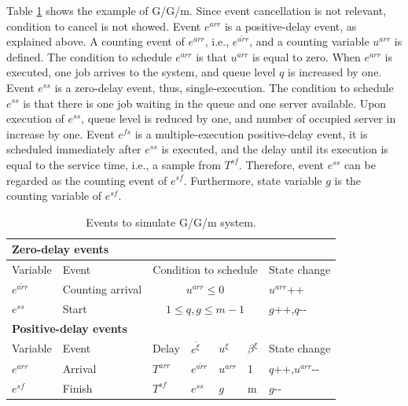 \documentclass[]{interact}
\theoremstyle{plain}%
\theoremstyle{definition}
\theoremstyle{remark}
\begin{document}
Table \ref{tab:ggm_1} shows the example of G/G/m. Since event cancellation is not relevant, condition to cancel is not showed. Event $e^{arr}$ is a positive-delay event, as explained above. %
A counting event of $e^{arr}$, i.e., $e^{\tilde{arr}}$, and a counting variable $u^{arr}$ is defined. The condition to schedule $e^{arr}$ is that $u^{arr}$ is equal to zero. When $e^{arr}$ is executed, one job arrives to the system, and queue level $q$ is increased by one. Event $e^{ss}$ is a zero-delay event, thus, single-execution. The condition to schedule $e^{ss}$ is that there is one job waiting in the queue and one server available. Upon execution of $e^{ss}$, queue level is reduced by one, and number of occupied server in increase by one. Event $e^{fs}$ is a multiple-execution positive-delay event, it is scheduled immediately after $e^{ss}$ is executed, and the delay until its execution is equal to the service time, i.e., a sample from $T^{sf}$. Therefore, event $e^{ss}$ can be regarded as the counting event of $e^{sf}$. Furthermore, state variable $g$ is the counting variable of $e^{sf}$. %

\begin{table}[h]
	\begin{tabular}{lllllll}
		\multicolumn{7}{l}{\textbf{Zero-delay events}}\\ \hline
		Variable&Event &  \multicolumn{4}{c}{Condition to schedule} & State change\\\hline%
		$e^{\tilde{arr}}$ & Counting arrival&  \multicolumn{4}{c}{$u^{arr}\le0$} & $u^{arr}${\footnotesize++} \\
		$e^{ss}$& Start 	& \multicolumn{4}{c}{$1\le q, g\le m-1$} & $g${\footnotesize++},$q${\small-}{\small-}  \\
		\multicolumn{7}{l}{\textbf{Positive-delay events}}\\ \hline
		Variable&Event & Delay& $e^{\tilde{\xi}}$& $u^{\xi}$ &$\beta^{\xi}$& State change\\\hline
		$e^{arr}$& Arrival & $T^{arr}$& $e^{\tilde{arr}}$& $u^{arr}$ &1& $q${\footnotesize++},$u^{arr}${\small-}{\small-} \\	
		$e^{sf}$& Finish & $T^{sf}$& $e^{ss}$& $g$  &m& $g${\small-}{\small-} \\\hline
	\end{tabular}
	\caption{Events to simulate G/G/m system.}
	\label{tab:ggm_1}
\end{table}
\end{document}

